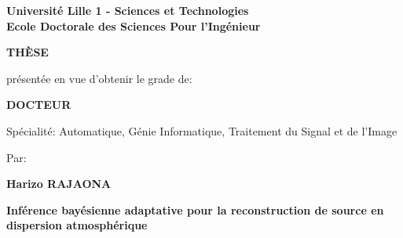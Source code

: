 \thispagestyle{empty}


{\large

\begin{center}

{\bf Université Lille 1 - Sciences et Technologies\\ 
	Ecole Doctorale des Sciences Pour l'Ingénieur} 

\vspace*{0.4cm}

{\large {\bf TH\`ESE}}

\vspace*{0.25cm}

présentée en vue d'obtenir le grade de:

\vspace*{0.25cm}

{\large {\bf DOCTEUR}}

\vspace*{0.25cm}

Spécialité: Automatique, Génie Informatique, Traitement du Signal et de l'Image

\vspace*{0.4cm}

Par:

\vspace*{0.25cm}

{\Large {\bf Harizo RAJAONA}}

\vspace*{1.5cm}



{\huge {\bf Inférence bayésienne adaptative pour la reconstruction de source en dispersion atmosphérique }}

\end{center}
\vspace*{1.5cm} 

}
